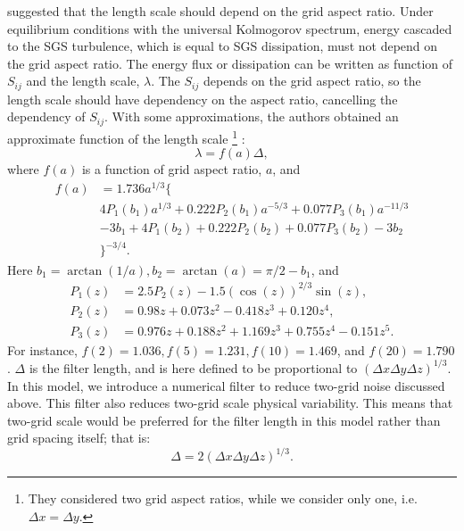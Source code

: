 \citet{Scotti_1993} suggested that the length scale should depend on the grid aspect ratio.
Under equilibrium conditions with the universal Kolmogorov spectrum, energy cascaded to the SGS turbulence, which is equal to SGS dissipation, must not depend on the grid aspect ratio.
The energy flux or dissipation can be written as function of $S_{ij}$ and the length scale, $\lambda$.
The $S_{ij}$ depends on the grid aspect ratio, so the length scale should have dependency on the aspect ratio, cancelling the dependency of $S_{ij}$.
With some approximations, the authors obtained an approximate function of the length scale
\footnote{They considered two grid aspect ratios, while we consider only one, i.e. $\Delta x = \Delta y$.}
:
\begin{equation}
\lambda = f(a) \Delta,
\end{equation}
where $f(a)$ is a function of grid aspect ratio, $a$, and
\begin{align}
  f(a) &= 1.736 a^{1/3} \{ \nonumber\\
  & 4P_1(b_1)a^{1/3} + 0.222P_2(b_1)a^{-5/3} + 0.077P_3(b_1)a^{-11/3} \nonumber\\
  & - 3b_1 + 4P_1(b_2) + 0.222P_2(b_2) + 0.077P_3(b_2)- 3b_2 \nonumber\\
  & \}^{-3/4}. \label{eq: f}
\end{align}
Here $b_1 = \arctan(1/a), b_2 = \arctan(a) = \pi/2 - b_1$, and
\begin{align}
  P_1(z) &= 2.5P_2(z) - 1.5 (\cos(z))^{2/3} \sin(z), \\
  P_2(z) &= 0.98z + 0.073z^2 -0.418z^3 + 0.120z^4, \\
  P_3(z) &= 0.976z + 0.188z^2 + 1.169z^3 + 0.755z^4 - 0.151z^5.
\end{align}
For instance, $f(2) = 1.036, f(5) = 1.231, f(10) = 1.469$, and $f(20) = 1.790$.
$\Delta$ is the filter length, and is here defined to be proportional to $(\Delta x \Delta y \Delta z)^{1/3}$.
In this model, we introduce a numerical filter to reduce two-grid noise discussed above.
This filter also reduces two-grid scale physical variability. This means that two-grid scale would be preferred for the filter length in this model rather than grid spacing itself; that is:
\begin{equation}
  \Delta = 2 (\Delta x \Delta y \Delta z)^{1/3}. \label{eq: delta}
\end{equation}


